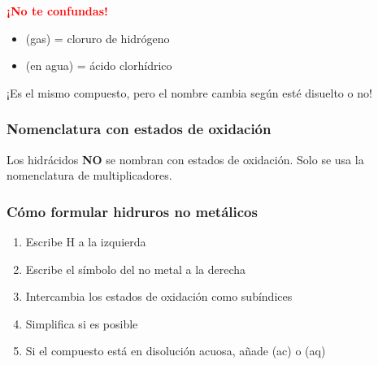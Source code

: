 \vspace{0.3cm}
\singlespacing
\begin{remark}
    \textbf{\textcolor{red}{¡No te confundas!}}
    \begin{itemize}
        \item {} (gas) = cloruro de hidrógeno
        \item {} (en agua) = ácido clorhídrico
    \end{itemize}
    ¡Es el mismo compuesto, pero el nombre cambia según esté disuelto o no!
\end{remark}
\vspace{0.3cm}

\subsubsection{Nomenclatura con estados de oxidación}

Los hidrácidos \textbf{NO} se nombran con estados de oxidación. Solo se usa la nomenclatura de multiplicadores.

\subsubsection{Cómo formular hidruros no metálicos}

\begin{enumerate}
    \item Escribe H a la izquierda
    \item Escribe el símbolo del no metal a la derecha
    \item Intercambia los estados de oxidación como subíndices
    \item Simplifica si es posible
    \item Si el compuesto está en disolución acuosa, añade (ac) o (aq)
\end{enumerate}

